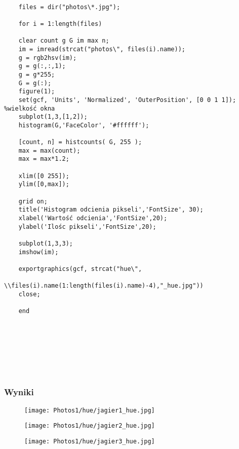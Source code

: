 \documentclass[]{mwart}
\begin{document}
\begin{verbatim}
    
    files = dir("photos\*.jpg");
    
    for i = 1:length(files)
    
    clear count g G im max n;
    im = imread(strcat("photos\", files(i).name));
    g = rgb2hsv(im);
    g = g(:,:,1);
    g = g*255;
    G = g(:);
    figure(1);
    set(gcf, 'Units', 'Normalized', 'OuterPosition', [0 0 1 1]); %wielkość okna
    subplot(1,3,[1,2]); 
    histogram(G,'FaceColor', '#ffffff');
    
    [count, n] = histcounts( G, 255 );
    max = max(count);
    max = max*1.2;
    
    xlim([0 255]);
    ylim([0,max]);
    
    grid on;
    title('Histogram odcienia pikseli','FontSize', 30);
    xlabel('Wartość odcienia','FontSize',20);
    ylabel('Ilośc pikseli','FontSize',20);
    
    subplot(1,3,3);
    imshow(im);
    
    exportgraphics(gcf, strcat("hue\", 
                        \\files(i).name(1:length(files(i).name)-4),"_hue.jpg"))
    close;
    
    end
    
  
    
    
    
    
    
    \end{verbatim}
\newpage


\subsubsection{Wyniki}

\begin{figure}[H]
    \centering
    \texttt{[image: Photos1/hue/jagier1\_hue.jpg]}

\end{figure}
\begin{figure}[H]
    \centering
    \texttt{[image: Photos1/hue/jagier2\_hue.jpg]}

\end{figure}
\begin{figure}[H]
    \centering
    \texttt{[image: Photos1/hue/jagier3\_hue.jpg]}

\end{figure}
\end{document}
